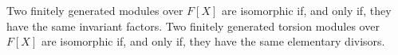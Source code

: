 Two finitely generated modules over $F[X]$ are isomorphic if, and only if, they have the same invariant factors. Two finitely generated torsion modules over $F[X]$ are isomorphic if, and only if, they have the same elementary divisors.
